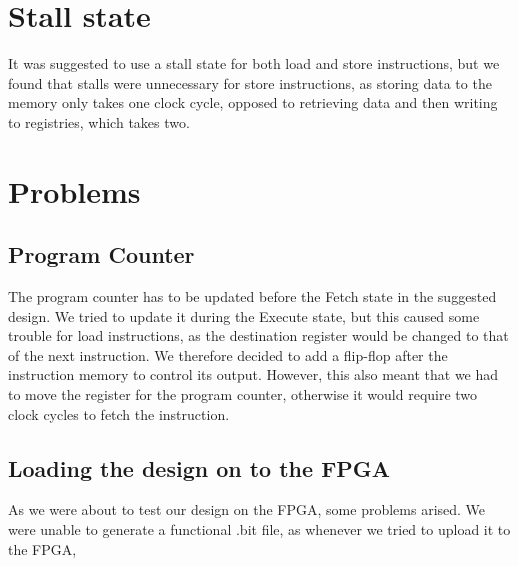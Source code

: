 \section{Stall state}

It was suggested to use a stall state for both load and store instructions, but we found that stalls were unnecessary for store instructions, as storing data to the memory only takes one clock cycle, opposed to retrieving data and then writing to registries, which takes two.

\section{Problems}

\subsection{Program Counter}

The program counter has to be updated before the Fetch state in the suggested design. We tried to update it during the Execute state, but this caused some trouble for load instructions, as the destination register would be changed to that of the next instruction. We therefore decided to add a flip-flop after the instruction memory to control its output. However, this also meant that we had to move the register for the program counter, otherwise it would require two clock cycles to fetch the instruction.

\subsection{Loading the design on to the FPGA}

As we were about to test our design on the FPGA, some problems arised. We were
unable to generate a functional .bit file, as whenever we tried to upload it to
the FPGA, 
